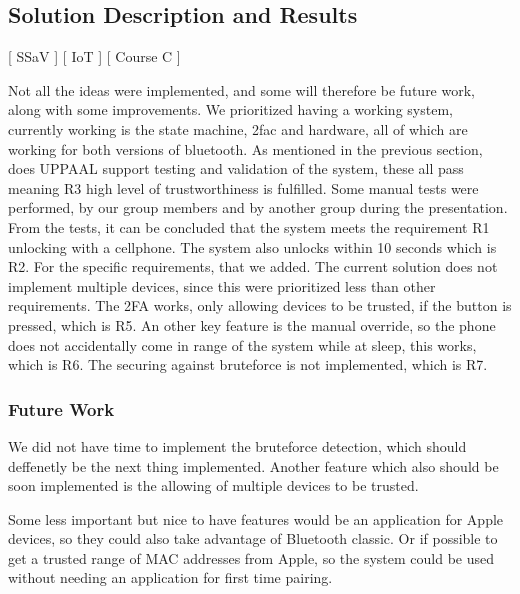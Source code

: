 \subsection{Solution Description and Results}
[ SSaV ] [ IoT ] [ Course C ] 
\newline
[ Casper ] [ Phu ] [ Simon ] 
\newline
\begin{comment}
The solution provides the functionality of connecting with bluetooth to the ESP, if the bluetooth connection is recognized as a trusted device, it will allow the user to enter. While it is also possible to open up the door with the potentiometer in case that the bluetooth is unable to connect, the idea is that malfunctions could happen and the user would still need access to their house and or belongings. If it were the case that non of the intended methods to gain entry is used, the bluetooth connection and potentiometer, an alarm will be set of as it would then be considered a forced entry.
\end{comment}

Not all the ideas were implemented, and some will therefore be future work, along with some improvements.
We prioritized having a working system, currently working is the state machine, 2fac and hardware, all of which are working for both versions of bluetooth.
As mentioned in the previous section, does UPPAAL support testing and validation of the system, these all pass meaning R3 high level of trustworthiness is fulfilled.
Some manual tests were performed, by our group members and by another group during the presentation.
From the tests, it can be concluded that the system meets the requirement R1 unlocking with a cellphone.
The system also unlocks within 10 seconds which is R2.
For the specific requirements, that we added.
The current solution does not implement multiple devices, since this were prioritized less than other requirements.
The 2FA works, only allowing devices to be trusted, if the button is pressed, which is R5.
An other key feature is the manual override, so the phone does not accidentally come in range of the system while at sleep, this works, which is R6.
The securing against bruteforce is not implemented, which is R7.

\subsubsection{Future Work}
We did not have time to implement the bruteforce detection, which should deffenetly be the next thing implemented. Another feature which also should be soon implemented is the allowing of multiple devices to be trusted.

Some less important but nice to have features would be an application for Apple devices, so they could also take advantage of Bluetooth classic.
Or if possible to get a trusted range of MAC addresses from Apple, so the system could be used without needing an application for first time pairing.
